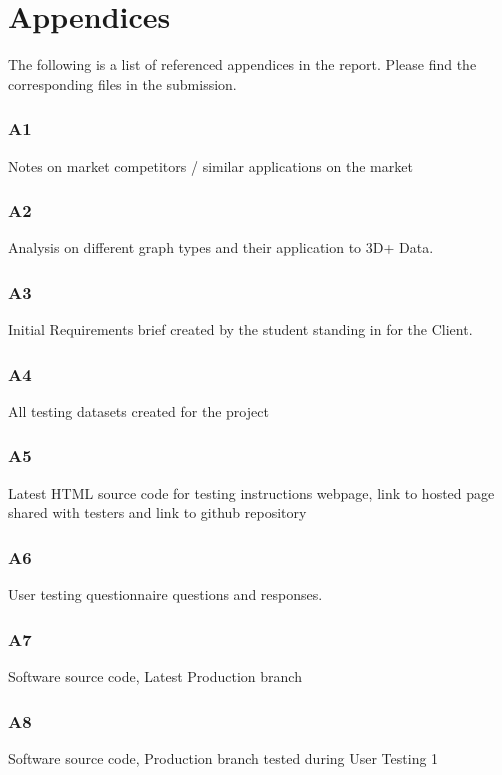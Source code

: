 \section{Appendices}
The following is a list of referenced appendices in the report. Please find the corresponding files in the submission.

\subsubsection{A1} \label{A1}
Notes on market competitors / similar applications on the market

\subsubsection{A2} \label{A2}
Analysis on different graph types and their application to 3D+ Data.

\subsubsection{A3} \label{A3}
Initial Requirements brief created by the student standing in for the Client.

\subsubsection{A4} \label{A4}
All testing datasets created for the project

\subsubsection{A5} \label{A5}
Latest HTML source code for testing instructions webpage, link to hosted page shared with testers and link to github repository

\subsubsection{A6} \label{A6}
User testing questionnaire questions and responses.

\subsubsection{A7} \label{A7}
Software source code, Latest Production branch

\subsubsection{A8} \label{A8}
Software source code, Production branch tested during User Testing 1


